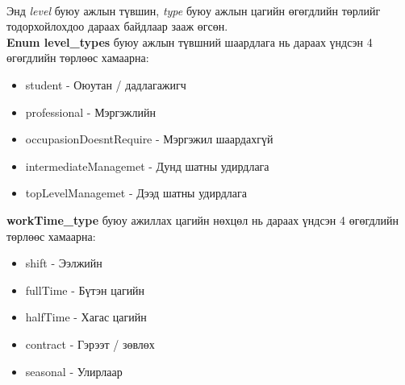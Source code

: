 \\Энд \textit{level} буюу ажлын түвшин, \textit{type} буюу ажлын цагийн өгөгдлийн төрлийг тодорхойлохдоо дараах байдлаар зааж өгсөн.
\\\textbf{Enum level\_types} буюу ажлын түвшний шаардлага нь дараах үндсэн 4 өгөгдлийн төрлөөс хамаарна:
\begin{itemize}
  \item student - Оюутан / дадлагажигч
  \item professional - Мэргэжлийн
  \item occupasionDoesntRequire - Мэргэжил шаардахгүй
  \item intermediateManagemet - Дунд шатны удирдлага
  \item topLevelManagemet - Дээд шатны удирдлага
\end{itemize}
\textbf{workTime\_type} буюу ажиллах цагийн нөхцөл нь дараах үндсэн 4 өгөгдлийн төрлөөс хамаарна:
\begin{itemize}
  \item shift - Ээлжийн
  \item fullTime - Бүтэн цагийн
  \item halfTime - Хагас цагийн
  \item contract - Гэрээт / зөвлөх
  \item seasonal - Улирлаар
\end{itemize}

